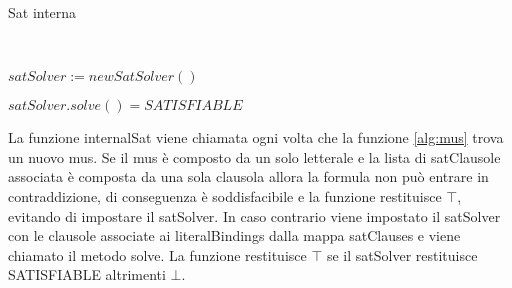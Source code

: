 \documentclass[./main.tex]{subfiles}
\begin{document}
\begin{algorithm}[H] \label{alg:internalSat}
    \caption{Sat interna}
    \\

$satSolver := newSatSolver()$\;

\Return $satSolver.solve() = SATISFIABLE$\;
\end{algorithm}

La funzione internalSat viene chiamata ogni volta che la funzione \ref{alg:mus}
trova un nuovo mus. 
Se il mus è composto da un solo letterale e la lista di satClausole associata è composta 
da una sola clausola allora la formula non può entrare in contraddizione, di conseguenza 
è soddisfacibile e la funzione restituisce $\top$, evitando di impostare il satSolver.
In caso contrario viene impostato il satSolver con le clausole associate
ai literalBindings dalla mappa satClauses e viene chiamato il metodo solve.
La funzione restituisce $\top$ se il satSolver restituisce SATISFIABLE altrimenti $\bot$.
\end{document}
